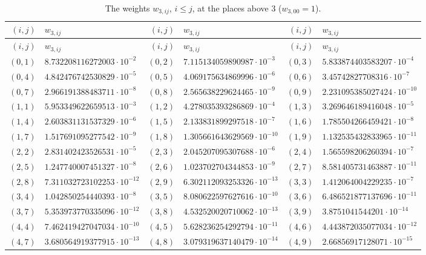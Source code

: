{\footnotesize
\begin{longtable}{rlrlrl}
\caption{The weights $w_{3,ij}$, $i\le j$, at the places above $3$ ($w_{3,00}=1$).}\label{fw-data:3}\\
\toprule
$(i,j)$ & $w_{3,ij}$ & $(i,j)$ & $w_{3,ij}$ & $(i,j)$ & $w_{3,ij}$\\
\midrule
\endfirsthead
\toprule
$(i,j)$ & $w_{3,ij}$ & $(i,j)$ & $w_{3,ij}$ & $(i,j)$ & $w_{3,ij}$\\
\midrule
\endhead
$(0,1)$ & $8.732208116272003\cdot10^{-2}$ & $(0,2)$ & $7.115134059890987\cdot10^{-3}$ & $(0,3)$ & $5.833874403583207\cdot10^{-4}$\\
$(0,4)$ & $4.842476742530829\cdot10^{-5}$ & $(0,5)$ & $4.069175634869996\cdot10^{-6}$ & $(0,6)$ & $3.45742827708316\cdot10^{-7}$\\
$(0,7)$ & $2.966191388483711\cdot10^{-8}$ & $(0,8)$ & $2.565638229624465\cdot10^{-9}$ & $(0,9)$ & $2.231095385027424\cdot10^{-10}$\\
$(1,1)$ & $5.953349622659513\cdot10^{-3}$ & $(1,2)$ & $4.278035393286869\cdot10^{-4}$ & $(1,3)$ & $3.269646189416048\cdot10^{-5}$\\
$(1,4)$ & $2.603831131537329\cdot10^{-6}$ & $(1,5)$ & $2.133831899297518\cdot10^{-7}$ & $(1,6)$ & $1.785504266459421\cdot10^{-8}$\\
$(1,7)$ & $1.517691095277542\cdot10^{-9}$ & $(1,8)$ & $1.305661643629569\cdot10^{-10}$ & $(1,9)$ & $1.132535432833965\cdot10^{-11}$\\
$(2,2)$ & $2.831402423526531\cdot10^{-5}$ & $(2,3)$ & $2.045207095307688\cdot10^{-6}$ & $(2,4)$ & $1.565598206260394\cdot10^{-7}$\\
$(2,5)$ & $1.247740007451327\cdot10^{-8}$ & $(2,6)$ & $1.023702704344853\cdot10^{-9}$ & $(2,7)$ & $8.581405731463887\cdot10^{-11}$\\
$(2,8)$ & $7.311032723102253\cdot10^{-12}$ & $(2,9)$ & $6.302112093253326\cdot10^{-13}$ & $(3,3)$ & $1.412064004229235\cdot10^{-7}$\\
$(3,4)$ & $1.042850254440393\cdot10^{-8}$ & $(3,5)$ & $8.080622597627616\cdot10^{-10}$ & $(3,6)$ & $6.486521877137696\cdot10^{-11}$\\
$(3,7)$ & $5.353973770335096\cdot10^{-12}$ & $(3,8)$ & $4.532520020710062\cdot10^{-13}$ & $(3,9)$ & $3.8751041544201\cdot10^{-14}$\\
$(4,4)$ & $7.462419427047034\cdot10^{-10}$ & $(4,5)$ & $5.628236254292794\cdot10^{-11}$ & $(4,6)$ & $4.443872035077034\cdot10^{-12}$\\
$(4,7)$ & $3.680564919377915\cdot10^{-13}$ & $(4,8)$ & $3.079319637140479\cdot10^{-14}$ & $(4,9)$ & $2.66856917128071\cdot10^{-15}$\\

\end{longtable}}
